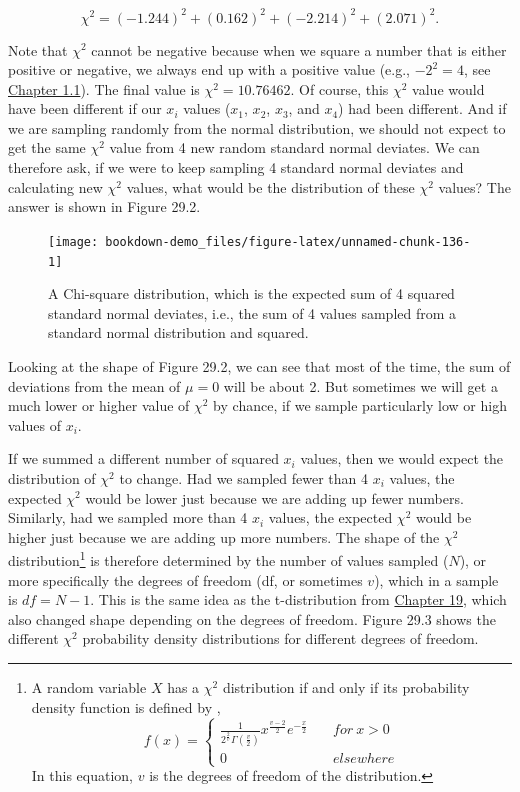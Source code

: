 \documentclass[
]{scrbook}
\begin{document}
\[\chi^{2} = (-1.244)^{2} + (0.162)^{2} + (-2.214)^{2} + (2.071)^{2}.\]

Note that \(\chi^{2}\) cannot be negative because when we square a number that is either positive or negative, we always end up with a positive value (e.g., \(-2^{2} = 4\), see \protect\hyperlink{numbers-and-operations}{Chapter 1.1}).
The final value is \(\chi^{2} = 10.76462\).
Of course, this \(\chi^{2}\) value would have been different if our \(x_{i}\) values (\(x_{1}\), \(x_{2}\), \(x_{3}\), and \(x_{4}\)) had been different.
And if we are sampling randomly from the normal distribution, we should not expect to get the same \(\chi^{2}\) value from 4 new random standard normal deviates.
We can therefore ask, if we were to keep sampling 4 standard normal deviates and calculating new \(\chi^{2}\) values, what would be the distribution of these \(\chi^{2}\) values?
The answer is shown in Figure 29.2.

\begin{figure}
\texttt{[image: bookdown-demo\_files/figure-latex/unnamed-chunk-136-1]} \caption{A Chi-square distribution, which is the expected sum of 4 squared standard normal deviates, i.e., the sum of 4 values sampled from a standard normal distribution and squared.}\label{fig:unnamed-chunk-136}
\end{figure}

Looking at the shape of Figure 29.2, we can see that most of the time, the sum of deviations from the mean of \(\mu = 0\) will be about 2.
But sometimes we will get a much lower or higher value of \(\chi^{2}\) by chance, if we sample particularly low or high values of \(x_{i}\).

If we summed a different number of squared \(x_{i}\) values, then we would expect the distribution of \(\chi^{2}\) to change.
Had we sampled fewer than 4 \(x_{i}\) values, the expected \(\chi^{2}\) would be lower just because we are adding up fewer numbers.
Similarly, had we sampled more than 4 \(x_{i}\) values, the expected \(\chi^{2}\) would be higher just because we are adding up more numbers.
The shape of the \(\chi^{2}\) distribution\footnote{A random variable \(X\) has a \(\chi^{2}\) distribution if and only if its probability density function is defined by \citep{Miller2004}, \[f(x) = \left\{\begin{array}{ll}\frac{1}{2^{\frac{2}{v}}\Gamma\left(\frac{v}{2}\right)}x^{\frac{v-2}{2}}e^{-\frac{x}{2}} & \quad for\:x > 0 \\ 0 & \quad elsewhere \end{array}\right.\] In this equation, \(v\) is the degrees of freedom of the distribution.} is therefore determined by the number of values sampled (\(N\)), or more specifically the degrees of freedom (df, or sometimes \(v\)), which in a sample is \(df = N - 1\).
This is the same idea as the t-distribution from \protect\hyperlink{Chapter_19}{Chapter 19}, which also changed shape depending on the degrees of freedom.
Figure 29.3 shows the different \(\chi^{2}\) probability density distributions for different degrees of freedom.
\end{document}
